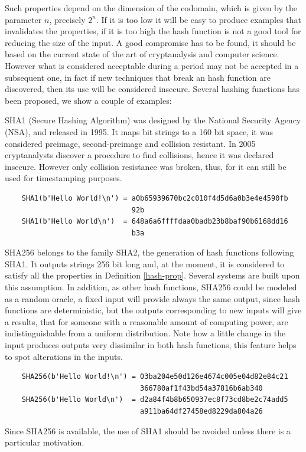 Such properties depend on the dimension of the codomain, which is given by the parameter $n$, precisely $2^n$. If it is too low it will be easy to produce examples that invalidates the properties, if it is too high the hash function is not a good tool for reducing the size of the input. A good compromise has to be found, it should be based on the current state of the art of cryptanalysis and computer science. However what is considered acceptable during a period may not be accepted in a subsequent one, in fact if new techniques that break an hash function are discovered, then its use will be considered insecure.
Several hashing functions has been proposed, we show a couple of examples:
\begin{myexample}
	SHA1 (Secure Hashing Algorithm) was designed by the National Security Agency (NSA), and released in 1995. It maps bit strings to a 160 bit space, it was considered preimage, second-preimage and collision resistant. In 2005 cryptanalysts discover a procedure to find collisions, hence it was declared insecure. However only collision resistance was broken, thus, for it can still be used for timestamping purposes.
	\begin{verbatim}
	SHA1(b'Hello World!\n') = a0b65939670bc2c010f4d5d6a0b3e4e4590fb
	                          92b
	SHA1(b'Hello World\n')  = 648a6a6ffffdaa0badb23b8baf90b6168dd16
	                          b3a
	\end{verbatim}
\end{myexample}

\begin{myexample}
	SHA256 belongs to the family SHA2, the generation of hash functions following SHA1. It outputs  strings 256 bit long and, at the moment, it is considered to satisfy all the properties in Definition \ref{hash-prop}.
	Several systems are built upon this assumption. 
	In addition, as other hash functions, SHA256 could be modeled as a random oracle, a fixed input will provide always the same output, since hash functions are deterministic, but the outputs corresponding to new inputs will give a results, that for someone with a reasonable amount of computing power, are indistinguishable from a uniform distribution. 
	Note how a little change in the input produces outputs very dissimilar in both hash functions, this feature helps to spot alterations in the inputs.
	\begin{verbatim}
	SHA256(b'Hello World!\n') = 03ba204e50d126e4674c005e04d82e84c21
	                            366780af1f43bd54a37816b6ab340
	SHA256(b'Hello World\n')  = d2a84f4b8b650937ec8f73cd8be2c74add5
	                            a911ba64df27458ed8229da804a26
	\end{verbatim}
	Since SHA256 is available, the use of SHA1 should be avoided unless there is a particular motivation. 
\end{myexample}

